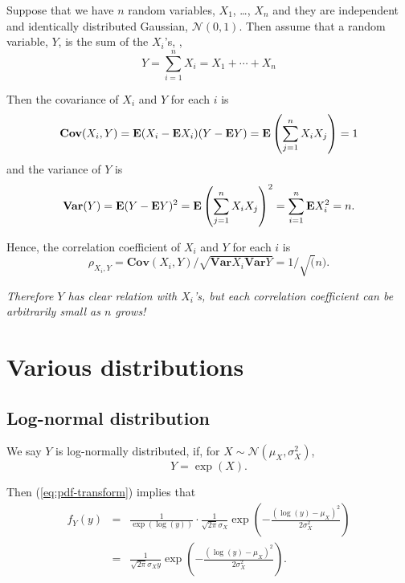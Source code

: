 Suppose that we have $n$ random variables, $X_1$, \ldots, $X_n$
and they are independent and identically distributed Gaussian, $\mathcal{N}(0,1)$.
Then assume that a random variable, $Y$, is the sum of the $X_i$'s,
\ie,
\begin{equation}
Y = \sum_{i=1}^n X_i = X_1 + \cdots + X_n
\end{equation}

Then the covariance of $X_i$ and $Y$ for each $i$ is
\begin{equation}
\mathbf{Cov}(X_i,Y) = \mathbf{E} (X_i - \mathbf{E}{X_i})( Y - \mathbf{E} Y) = \mathbf{E}\left( \sum_{j=1}^n X_iX_j\right) = 1
\end{equation}
and
the variance of $Y$ is
\begin{equation}
\mathbf{Var}(Y) = \mathbf{E} (Y - \mathbf{E} Y)^2 = \mathbf{E}\left( \sum_{j=1}^n X_iX_j\right)^2
= \sum_{i=1}^n \mathbf{E} X_i^2 = n.
\end{equation}

Hence, the correlation coefficient of $X_i$ and $Y$ for each $i$ is
\begin{equation}
\rho_{X_i,Y} = \mathbf{Cov}(X_i,Y) / \sqrt{\mathbf{Var}X_i \mathbf{Var} Y} = 1 / \sqrt(n).
\end{equation}

\emph{Therefore $Y$ has clear relation with $X_i$'s, but each correlation coefficient can be arbitrarily small as $n$ grows!}




\chapter{Various distributions}

\section{Log-normal distribution}

 We say $Y$ is log-normally distributed, if, for $X\sim\mathcal{N}(\mu_X,\sigma_X^2)$,
 \begin{equation}
 Y = \exp(X).
 \end{equation}

Then (\ref{eq:pdf-transform}) implies that
\begin{eqnarray}
f_Y(y) &=& \frac{1}{\exp(\log(y))} \cdot \frac{1}{\sqrt{2\pi} \sigma_X}  \exp\left(-\frac{(\log(y)-\mu_X)^2}{2\sigma_X^2}\right)
\nonumber
\\
&=& \frac{1}{\sqrt{2\pi} \sigma_X y}  \exp\left(-\frac{(\log(y)-\mu_X)^2}{2\sigma_X^2}\right).
\label{eq:log-normal-pdf}
\end{eqnarray}


